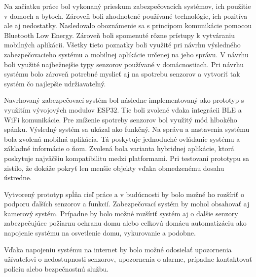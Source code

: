 Na začiatku práce bol vykonaný prieskum zabezpečovacích systémov, ich použitie v domoch a bytoch. Zároveň boli zhodnotené používané technológie, ich pozitíva ale aj nedostatky. Nasledovalo oboznámenie sa s princípom komunikácie pomocou Bluetooth Low Energy. Zároveň boli spomenuté rôzne prístupy k vytváraniu mobilných aplikácii. Všetky tieto poznatky boli využité pri návrhu výsledného zabezpečovacieho systému a mobilnej aplikácie určenej na jeho správu. V návrhu boli využité najbežnejšie typy senzorov používané v domácnostiach. Pri návrhu systému bolo zároveň potrebné myslieť aj na spotrebu senzorov a vytvoriť tak systém čo najlepšie udržiavateľný.

Navrhovaný zabezpečovací systém bol následne implementovaný ako prototyp s využitím vývojových modulov ESP32. Tie boli zvolené vďaka integrácii BLE a WiFi komunikácie. Pre zníženie spotreby senzorov bol využitý mód hlbokého spánku. Výsledný systém sa ukázal ako funkčný. Na správu a nastavenia systému bola zvolená mobilná aplikácia. Tá poskytuje jednoduché ovládanie systému a základné informácie o ňom. Zvolená bola varianta hybridnej aplikácie, ktorá poskytuje najväčšiu kompatibilitu medzi platformami. Pri testovaní prototypu sa zistilo, že dokáže pokryť len menšie objekty vďaka obmedzenému dosahu ústredne.

Vytvorený prototyp spĺňa cieľ práce a v budúcnosti by bolo možné ho rozšíriť o podporu ďalších senzorov a funkcií. Zabezpečovací systém by mohol obsahovať aj kamerový systém. Prípadne by bolo možné rozšíriť systém aj o ďalšie senzory zabezpečujúce požiarnu ochranu domu alebo celkovú domácu automatizáciu ako napojenie systému na osvetlenie domu, vykurovanie a podobne.

Vďaka napojeniu systému na internet by bolo možné odosielať upozornenia užívateľovi o nedostupnosti senzorov, upozornenia o alarme, prípadne kontaktovať políciu alebo bezpečnostnú službu.
